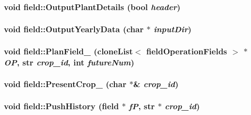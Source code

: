 \label{classfield_a82c55e295edd95a5de179d29cb77b231}
\hypertarget{classfield_a15884755ee5efe058ae4dd8feb64594b}{
\subsubsection[{OutputPlantDetails}]{\setlength{\rightskip}{0pt plus 5cm}void field::OutputPlantDetails (bool {\em header})}}
\label{classfield_a15884755ee5efe058ae4dd8feb64594b}
\hypertarget{classfield_a3839d27d6bdd8eb8c613c14bbea80e82}{
\subsubsection[{OutputYearlyData}]{\setlength{\rightskip}{0pt plus 5cm}void field::OutputYearlyData (char $\ast$ {\em inputDir})}}
\label{classfield_a3839d27d6bdd8eb8c613c14bbea80e82}
\hypertarget{classfield_a2943f6f16de6cd14db847055cf7a6f0e}{
\subsubsection[{PlanField\_\-}]{\setlength{\rightskip}{0pt plus 5cm}void field::PlanField\_\- ({\bf cloneList}$<$ {\bf fieldOperationFields} $>$ $\ast$ {\em OP}, \/  {\bf str} {\em crop\_\-id}, \/  int {\em futureNum})}}
\label{classfield_a2943f6f16de6cd14db847055cf7a6f0e}
\hypertarget{classfield_ac88e569c5e0854563c505665eba50e24}{
\subsubsection[{PresentCrop\_\-}]{\setlength{\rightskip}{0pt plus 5cm}void field::PresentCrop\_\- (char $\ast$\& {\em crop\_\-id})}}
\label{classfield_ac88e569c5e0854563c505665eba50e24}
\hypertarget{classfield_a51e15b1581712c50d383f2c64a3cc203}{
\subsubsection[{PushHistory}]{\setlength{\rightskip}{0pt plus 5cm}void field::PushHistory ({\bf field} $\ast$ {\em fP}, \/  {\bf str} $\ast$ {\em crop\_\-id})}}
